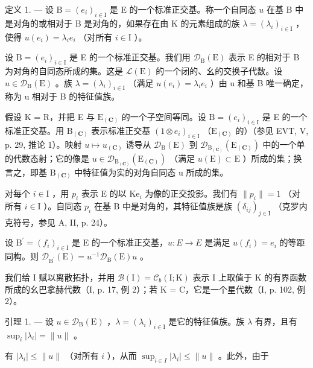 定义 1. --- 设 \(\mathrm{B} = (e_i)_{i \in \mathrm{I}}\) 是 E 的一个标准正交基。称一个自同态 \(u\) 在基 B 中是对角的或相对于 B 是对角的，如果存在由 K 的元素组成的族 \(\lambda = (\lambda_i)_{i \in \mathrm{I}}\) ，使得 \(u(e_i) = \lambda_i e_i\) （对所有 \(i \in \mathrm{I}\) ）。

设 \(\mathrm{B} = (e_i)_{i \in \mathrm{I}}\) 是 E 的一个标准正交基。我们用 \(\mathcal{D}_{\mathrm{B}}(\mathrm{E})\) 表示 E 的相对于 B 为对角的自同态所成的集。这是 \(\mathcal{L}(\mathrm{E})\) 的一个闭的、幺的交换子代数。设 \(u \in \mathcal{D}_{\mathrm{B}}(\mathrm{E})\) 。族 \(\lambda = (\lambda_i)_{i \in \mathrm{I}}\) （满足 \(u(e_i) = \lambda_i e_i\) ）由 u 和基 B 唯一确定，称为 u 相对于 B 的特征值族。

假设 K = R，并把 E 与 \(\mathrm{E}_{(\mathbf{C})}\) 的一个子空间等同。设 \(\mathrm{B} = (e_i)_{i \in \mathrm{I}}\) 是 E 的一个标准正交基。用 \(\mathrm{B}_{(\mathbf{C})}\) 表示标准正交基 \((1 \otimes e_i)_{i \in \mathrm{I}}\) （\(\mathrm{E}_{(\mathbf{C})}\) 的）（参见 EVT, V, p. 29, 推论 1）。映射 \(u \mapsto u_{(\mathbf{C})}\) 诱导从 \(\mathcal{D}_{\mathrm{B}}(\mathrm{E})\) 到 \(\mathcal{D}_{\mathrm{B}_{(\mathbf{C})}}(\mathrm{E}_{(\mathbf{C})})\) 中的一个单的代数态射；它的像是 \(u \in \mathcal{D}_{\mathrm{B}_{(\mathbf{C})}}(\mathrm{E}_{(\mathbf{C})})\) （满足 \(u(\mathrm{E}) \subset \mathrm{E}\) ）所成的集；换言之，即基 \(\mathrm{B}_{(\mathbf{C})}\) 中特征值为实的对角自同态 u 所成的集。

对每个 \(i \in \mathrm{I}\) ，用 \(p_i\) 表示 E 的以 \(\mathrm{Ke}_i\) 为像的正交投影。我们有 \(\| p_i \| = 1\) （对所有 \(i \in \mathrm{I}\) ）。自同态 \(p_i\) 在基 B 中是对角的，其特征值族是族 \((\delta_{ij})_{j\in\mathrm{I}}\) （克罗内克符号，参见 A, II, p. 24）。

设 \(\mathrm{B}^{\prime}=(f_{i})_{i\in\mathrm{I}}\) 是 E 的一个标准正交基，\(u:E\to E\) 是满足 \(u(f_{i})=e_{i}\) 的等距同构。则 \(\mathcal{D}_{\mathrm{B}^{\prime}}(\mathrm{E})=u^{-1}\mathcal{D}_{\mathrm{B}}(\mathrm{E})u\) 。

我们给 I 赋以离散拓扑，并用 \(\mathcal{B}(\mathrm{I}) = \mathcal{C}_{b}(\mathrm{I}; \mathrm{K})\) 表示 I 上取值于 K 的有界函数所成的幺巴拿赫代数（I, p. 17, 例 2）；若 K = C，它是一个星代数（I, p. 102, 例 2）。

引理 1. --- 设 \(u \in \mathcal{D}_{\mathrm{B}}(\mathrm{E})\) ，\(\lambda = (\lambda_i)_{i \in \mathrm{I}}\) 是它的特征值族。族 \(\lambda\) 有界，且有 \(\sup_i |\lambda_i| = \| u\|\) 。

有 \(|\lambda_i| \leqslant \|u\|\) （对所有 \(i\) ），从而 \(\sup_{i \in I} |\lambda_i| \leqslant \|u\|\) 。此外，由于

